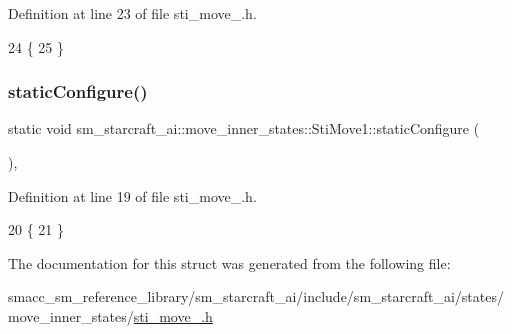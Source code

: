 Definition at line 23 of file sti\+\_\+move\+\_.\+h.


\begin{DoxyCode}
24   \{
25   \}
\end{DoxyCode}
\mbox{\label{structsm__starcraft__ai_1_1move__inner__states_1_1StiMove1_af5b082714bc05b79841e1b4b57a33c19}} 
\subsubsection{\texorpdfstring{static\+Configure()}{staticConfigure()}}
{\footnotesize\ttfamily static void sm\+\_\+starcraft\+\_\+ai\+::move\+\_\+inner\+\_\+states\+::\+Sti\+Move1\+::static\+Configure (\begin{DoxyParamCaption}{ }\end{DoxyParamCaption})\hspace{0.3cm}{\ttfamily [inline]}, {\ttfamily [static]}}



Definition at line 19 of file sti\+\_\+move\+\_.\+h.


\begin{DoxyCode}
20   \{
21   \}
\end{DoxyCode}


The documentation for this struct was generated from the following file\+:\begin{DoxyCompactItemize}
\item 
smacc\+\_\+sm\+\_\+reference\+\_\+library/sm\+\_\+starcraft\+\_\+ai/include/sm\+\_\+starcraft\+\_\+ai/states/move\+\_\+inner\+\_\+states/\hyperlink{sti__move__1_8h}{sti\+\_\+move\+\_.\+h}\end{DoxyCompactItemize}
